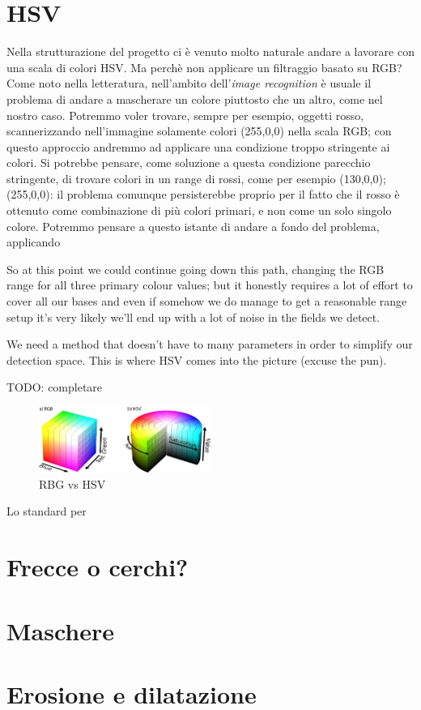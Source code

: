 \section{HSV}
Nella strutturazione del progetto ci è venuto molto naturale andare a lavorare con una scala di colori HSV. Ma perchè non applicare un filtraggio basato su RGB?
Come noto nella letteratura, nell'ambito dell'\textit{image recognition} è usuale il problema di andare a mascherare un colore piuttosto che un altro, come nel nostro caso.
Potremmo voler trovare, sempre per esempio, oggetti rosso, scannerizzando nell'immagine solamente colori (255,0,0) nella scala RGB; con questo approccio andremmo ad applicare una condizione troppo stringente ai colori.
Si potrebbe pensare, come soluzione a questa condizione parecchio stringente, di trovare colori in un range di rossi, come per esempio {(130,0,0);(255,0,0)}: il problema comunque persisterebbe proprio per il fatto che il rosso è ottenuto come combinazione di più colori primari, e non come un solo singolo colore.
Potremmo pensare a questo istante di andare a fondo del problema, applicando 

So at this point we could continue going down this path, changing the RGB range for all three primary colour values; but it honestly requires a lot of effort to cover all our bases and even if somehow we do manage to get a reasonable range setup it’s very likely we’ll end up with a lot of noise in the fields we detect.

We need a method that doesn’t have to many parameters in order to simplify our detection space. This is where HSV comes into the picture (excuse the pun).

TODO: completare

\begin{figure}
	\centering
	\includegraphics[width=0.5\textwidth]{Immagini/HSV_RGB.jpeg}
	\caption{RBG vs HSV}
	\label{fig:TrustCam}
\end{figure}

Lo standard per 
\section{Frecce o cerchi?}
\section{Maschere}
\section{Erosione e dilatazione}